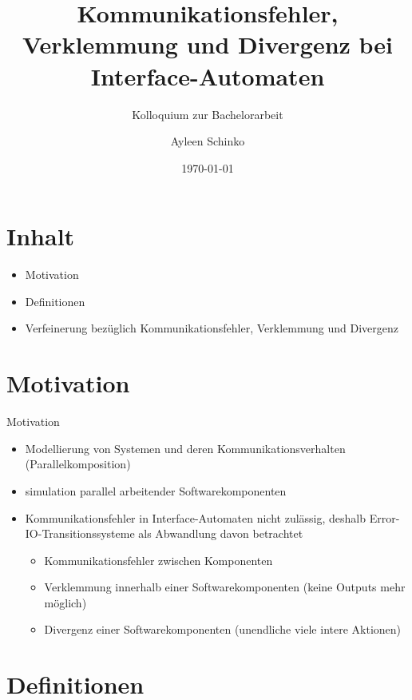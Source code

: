 \documentclass[mathserif]{beamer}
\title{Kommunikationsfehler, Verklemmung und Divergenz bei Interface-Automaten}
\subtitle{Kolloquium zur Bachelorarbeit}
\author{Ayleen Schinko}
\date{\today}
\begin{document}
\maketitle
\section{Inhalt}
\begin{frame}
  \begin{itemize}
      \item Motivation
      \item Definitionen
      \item Verfeinerung bezüglich Kommunikationsfehler, Verklemmung und
        Divergenz
  \end{itemize}
\end{frame}

\section{Motivation}
\begin{frame}
  \begin{center}
    \Large{Motivation}
  \end{center}
  \begin{itemize}
    \item Modellierung von Systemen und deren Kommunikationsverhalten
      (Parallelkomposition)
    \item simulation parallel arbeitender Softwarekomponenten
    \item Kommunikationsfehler in Interface-Automaten nicht zulässig, deshalb
      Error-IO-Transitionssysteme als Abwandlung davon betrachtet
      \begin{itemize}
        \item Kommunikationsfehler zwischen Komponenten
        \item Verklemmung innerhalb einer Softwarekomponenten (keine Outputs
          mehr möglich)
        \item Divergenz einer Softwarekomponenten (unendliche viele intere
          Aktionen)
      \end{itemize}
  \end{itemize}
\end{frame}

\section{Definitionen}
\begin{frame}
\end{frame}
\end{document}
